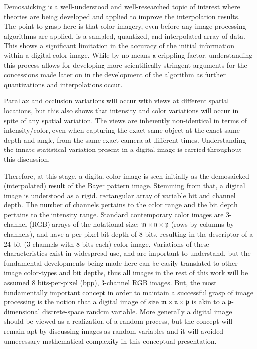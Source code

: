 Demosaicking is a well-understood and well-researched topic of interest where theories are being developed and applied to improve the interpolation results. The point to grasp here is that color imagery, even before any image processing algorithms are applied, is a sampled, quantized, and interpolated array of data. This shows a significant limitation in the accuracy of the initial information within a digital color image. While by no means a crippling factor, understanding this process allows for developing more scientifically stringent arguments for the concessions made later on in the development of the algorithm as further quantizations and interpolations occur.

Parallax and occlusion variations will occur with views at different spatial locations, but this also shows that intensity and color variations will occur in spite of any spatial variation. The views are inherently non-identical in terms of intensity/color, even when capturing the exact same object at the exact same depth and angle, from the same exact camera at different times. Understanding the innate statistical variation present in a digital image is carried throughout this discussion.

Therefore, at this stage, a digital color image is seen initially as the demosaicked (interpolated) result of the Bayer pattern image. Stemming from that, a digital image is understood as a rigid, rectangular array of variable bit and channel depth. The number of channels pertains to the color range and the bit depth pertains to the intensity range. Standard contemporary color images are 3-channel (RGB) arrays of the notational size: $\mathfrak{m}\times\mathfrak{n}\times\mathfrak{p}$ (rows-by-columns-by-channels), and have a per pixel bit-depth of 8-bits, resulting in the descriptor of a 24-bit (3-channels with 8-bits each) color image. Variations of these characteristics exist in widespread use, and are important to understand, but the fundamental developments being made here can be easily translated to other image color-types and bit depths, thus all images in the rest of this work will be assumed 8 bits-per-pixel (bpp), 3-channel RGB images. But, the most fundamentally important concept in order to maintain a successful grasp of image processing is the notion that a digital image of size $\mathfrak{m} \times \mathfrak{n} \times \mathfrak{p}$ is akin to a $\mathfrak{p}$-dimensional discrete-space random variable. More generally a digital image should be viewed as a realization of a random process, but the concept will remain apt by discussing images as random variables and it will avoided unnecessary mathematical complexity in this conceptual presentation.

